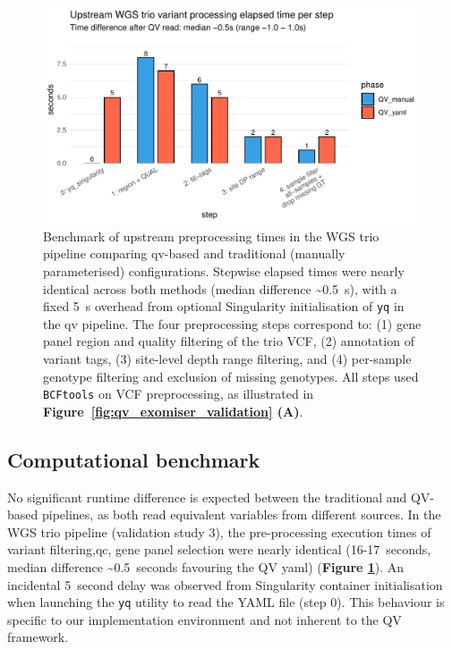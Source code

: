 \begin{figure}[!t]
\centering
\includegraphics[width=\textwidth]{./images/qv_exomiser/benchmark_preprocess_time_bars_by_step_elapsed.pdf}
\caption{Benchmark of upstream preprocessing times in the WGS trio pipeline comparing \ac{qv}-based and traditional (manually parameterised) configurations. Stepwise elapsed times were nearly identical across both methods (median difference \textasciitilde0.5~s), with a fixed 5~s overhead from optional Singularity initialisation of \texttt{yq} in the \ac{qv} pipeline. The four preprocessing steps correspond to: (1) gene panel region and quality filtering of the trio VCF, (2) annotation of variant tags, (3) site-level depth range filtering, and (4) per-sample genotype filtering and exclusion of missing genotypes. All steps used \texttt{BCFtools} on VCF preprocessing, as illustrated in \textbf{Figure~\ref{fig:qv_exomiser_validation} (A)}.}
\label{fig:benchmark_preprocess_time_bars_by_step_elapsed}
\end{figure}

\subsection{Computational benchmark}
No significant runtime difference is expected between the traditional and QV-based pipelines, as both read equivalent variables from different sources. In the WGS trio pipeline (validation study 3), the pre-processing execution times of variant filtering,\ac{qc}, gene panel selection were nearly identical (16-17~seconds, median difference \textasciitilde0.5~seconds favouring the QV yaml) 
(\textbf{Figure \ref{fig:benchmark_preprocess_time_bars_by_step_elapsed}}). 
An incidental 5~second delay was observed from Singularity container initialisation when launching the \texttt{yq} utility to read the YAML file (step 0). This behaviour is specific to our implementation environment and not inherent to the QV framework.



